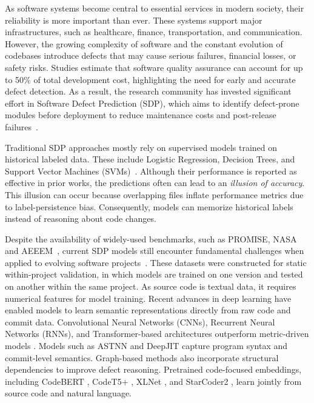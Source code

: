 \documentclass[authoryear,final,5p,times,twocolumn]{elsarticle}
\theoremstyle{plain}
\begin{document}
As software systems become central to essential services in modern society, their reliability is more important than ever. These systems support major infrastructures, such as healthcare, finance, transportation, and communication. However, the growing complexity of software and the constant evolution of codebases introduce defects that may cause serious failures, financial losses, or safety risks. Studies estimate that software quality assurance can account for up to 50\% of total development cost, highlighting the need for early and accurate defect detection. As a result, the research community has invested significant effort in Software Defect Prediction (SDP), which aims to identify defect-prone modules before deployment to reduce maintenance costs and post-release failures~\textcolor{red}{\citep{Li2018, Hall2012}}.

Traditional SDP approaches mostly rely on supervised models trained on historical labeled data. These include Logistic Regression, Decision Trees, and Support Vector Machines (SVMs)~\citep{Rahman2013, Tantithamthavorn2018, Hosseini2017}. Although their performance is reported as effective in prior works, the predictions often can lead to an \emph{illusion of accuracy}. This illusion can occur because overlapping files inflate performance metrics due to label-persistence bias. Consequently, models can memorize historical labels instead of reasoning about code changes.

Despite the availability of widely-used benchmarks, such as PROMISE, NASA~\citep{promiserepo} and AEEEM~\citep{d2012evaluating}, current SDP models still encounter fundamental challenges when applied to evolving software projects~\citep{nevendra2022survey}. 
These datasets were constructed for static within-project validation, in which models are trained on one version and tested on another within the same project. As source code is textual data, it requires numerical features for model training. Recent advances in deep learning have enabled models to learn semantic representations directly from raw code and commit data. Convolutional Neural Networks (CNNs), Recurrent Neural Networks (RNNs), and Transformer-based architectures outperform metric-driven models \citep{zhou2024research, liu2025improved, Majd2021}. Models such as ASTNN \citep{Zhou2019} and DeepJIT \citep{Hoang2020} capture program syntax and commit-level semantics. Graph-based methods \citep{Dam2019, Adediran2024} also incorporate structural dependencies to improve defect reasoning. Pretrained code-focused embeddings, including CodeBERT \citep{Feng2020}, CodeT5+ \citep{Wang2023}, XLNet \citep{yang2019xlnet}, and StarCoder2 \citep{lozhkov2024starcoder}, learn jointly from source code and natural language. 
\end{document}
